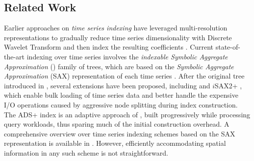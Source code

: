 \subsection{Related Work}
\label{sec:related}

Earlier approaches on {\em time series indexing} have leveraged multi-resolution representations to gradually reduce time series dimensionality with Discrete Wavelet Transform and then index the resulting coefficients \cite{chan1999icde, popivanov2002icde}. Current state-of-the-art indexing over time series involves the {\em indexable Symbolic Aggregate Approximation} (\isax) family of trees, which are based on the {\em Symbolic Aggregate Approximation} (SAX) representation of each time series \cite{jessica2007dmkd}. After the original \isax tree introduced in \cite{shieh2008kdd}, several extensions have been proposed, including  \cite{camerra2010icdm} and $i$SAX2+ \cite{camerra2014kais}, which enable bulk loading of time series data and better handle the expensive I/O operations caused by aggressive node splitting during index construction. The ADS+ index \cite{zoumpatianos2014sigmod} is an adaptive approach of \isax, built progressively while processing query workloads, thus sparing much of the initial construction overhead. A comprehensive overview over time series indexing schemes based on the SAX representation is available in \cite{palpanas2016bigsm}. However, efficiently accommodating spatial information in any such scheme is not straightforward.




